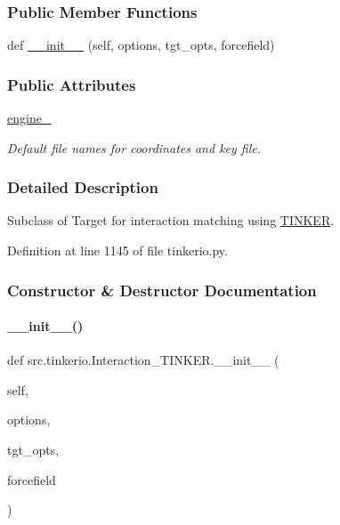 \subsubsection*{Public Member Functions}
\begin{DoxyCompactItemize}
\item 
def \hyperlink{classsrc_1_1tinkerio_1_1Interaction__TINKER_afa64e6f9f9e073629086821ecb35bb66}{\+\_\+\+\_\+init\+\_\+\+\_\+} (self, options, tgt\+\_\+opts, forcefield)
\end{DoxyCompactItemize}
\subsubsection*{Public Attributes}
\begin{DoxyCompactItemize}
\item 
\hyperlink{classsrc_1_1tinkerio_1_1Interaction__TINKER_a16a2a97d6e2b945863fa37c163cbc67f}{engine\+\_\+}
\begin{DoxyCompactList}\small\item\em Default file names for coordinates and key file. \end{DoxyCompactList}\end{DoxyCompactItemize}


\subsubsection{Detailed Description}
Subclass of Target for interaction matching using \hyperlink{classsrc_1_1tinkerio_1_1TINKER}{T\+I\+N\+K\+ER}. 



Definition at line 1145 of file tinkerio.\+py.



\subsubsection{Constructor \& Destructor Documentation}
\mbox{\label{classsrc_1_1tinkerio_1_1Interaction__TINKER_afa64e6f9f9e073629086821ecb35bb66}} 
\paragraph{\texorpdfstring{\+\_\+\+\_\+init\+\_\+\+\_\+()}{\_\_init\_\_()}}
{\footnotesize\ttfamily def src.\+tinkerio.\+Interaction\+\_\+\+T\+I\+N\+K\+E\+R.\+\_\+\+\_\+init\+\_\+\+\_\+ (\begin{DoxyParamCaption}\item[{}]{self,  }\item[{}]{options,  }\item[{}]{tgt\+\_\+opts,  }\item[{}]{forcefield }\end{DoxyParamCaption})}



